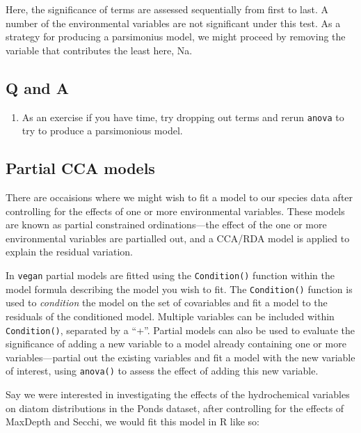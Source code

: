 \documentclass[a4paper,10pt]{article}
\newcommand{\R}{\textsf{R}\xspace}
\newcommand{\vegan}{\texttt{vegan}\xspace}
\begin{document}
Here, the significance of terms are assessed sequentially from first to last. A number of the environmental variables are not significant under this test. As a strategy for producing a parsimonius model, we might proceed by removing the variable that contributes the least here, Na.

\subsection*{Q and A}
\begin{enumerate}
\item As an exercise if you have time, try dropping out terms and rerun \texttt{anova} to try to produce a parsimonious model.
\end{enumerate}

\subsection{Partial CCA models}
There are occaisions where we might wish to fit a model to our species data after controlling for the effects of one or more environmental variables. These models are known as partial constrained ordinations---the effect of the one or more environmental variables are partialled out, and a CCA/RDA model is applied to explain the residual variation.

In \vegan partial models are fitted using the \texttt{Condition()} function within the model formula describing the model you wish to fit. The \texttt{Condition()} function is used to \emph{condition} the model on the set of covariables and fit a model to the residuals of the conditioned model. Multiple variables can be included within \texttt{Condition()}, separated by a ``+''. Partial models can also be used to evaluate the significance of adding a new variable to a model already containing one or more variables---partial out the existing variables and fit a model with the new variable of interest, using \texttt{anova()} to assess the effect of adding this new variable.

Say we were interested in investigating the effects of the hydrochemical variables on diatom distributions in the Ponds dataset, after controlling for the effects of MaxDepth and Secchi, we would fit this model in \R like so:
\end{document}
